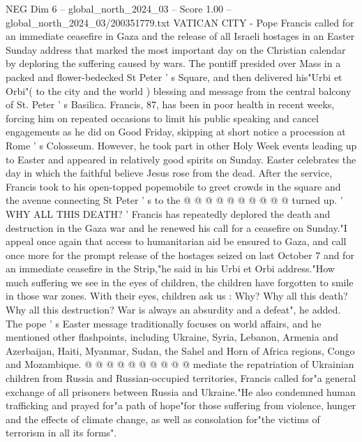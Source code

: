 \begin{textsample}{NEG Dim 6 – global\_north\_2024\_03 – Score 1.00 – global\_north\_2024\_03/200351779.txt}  \label{ex:f6_neg_404}
VATICAN CITY - Pope Francis called for an immediate ceasefire in Gaza and the release of all Israeli hostages in an Easter Sunday address that marked the most important day on the Christian calendar by deploring the suffering caused by wars.
The pontiff presided over Mass in a packed and flower-bedecked St Peter ' s Square, and then delivered his"Urbi et Orbi"( to the city and the world ) blessing and message from the central balcony of St.
Peter ' s Basilica.
Francis, 87, has been in poor health in recent weeks, forcing him on repeated occasions to limit his public speaking and cancel engagements as he did on Good Friday, skipping at short notice a procession at Rome ' s Colosseum.
However, he took part in other Holy Week events leading up to Easter and appeared in relatively good spirits on Sunday.
Easter celebrates the day in which the faithful believe Jesus rose from the dead.
After the service, Francis took to his open-topped popemobile to greet crowds in the square and the avenue connecting St Peter ' s to the @ @ @ @ @ @ @ @ @ @ turned up. ' WHY ALL THIS DEATH? ' Francis has repeatedly deplored the death and destruction in the Gaza war and he renewed his call for a ceasefire on Sunday."I appeal once again that access to humanitarian aid be ensured to Gaza, and call once more for the prompt release of the hostages seized on last October 7 and for an immediate ceasefire in the Strip,"he said in his Urbi et Orbi address."How much suffering we see in the eyes of children, the children have forgotten to smile in those war zones.
With their eyes, children ask us : Why?
Why all this death?
Why all this destruction?
War is always an absurdity and a defeat", he added.
The pope ' s Easter message traditionally focuses on world affairs, and he mentioned other flashpoints, including Ukraine, Syria, Lebanon, Armenia and Azerbaijan, Haiti, Myanmar, Sudan, the Sahel and Horn of Africa regions, Congo and Mozambique. @ @ @ @ @ @ @ @ @ @ mediate the repatriation of Ukrainian children from Russia and Russian-occupied territories, Francis called for"a general exchange of all prisoners between Russia and Ukraine."He also condemned human trafficking and prayed for"a path of hope"for those suffering from violence, hunger and the effects of climate change, as well as consolation for"the victims of terrorism in all its forms".

\end{textsample}
